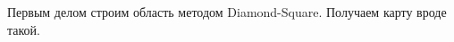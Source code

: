 \documentclass[]{article}
\numberwithin{equation}{section}
\begin{document}
    Первым делом строим область методом Diamond-Square. Получаем карту вроде такой.
\end{document}
